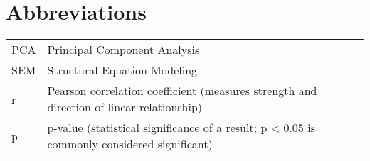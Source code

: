 \section*{Abbreviations}
\begin{tabular}{p{}p{}}
	PCA & Principal Component Analysis \\
    SEM & Structural Equation Modeling \\
	r & Pearson correlation coefficient (measures strength and direction of linear relationship) \\
    p & p-value (statistical significance of a result; p < 0.05 is commonly considered significant) \\
\end{tabular}